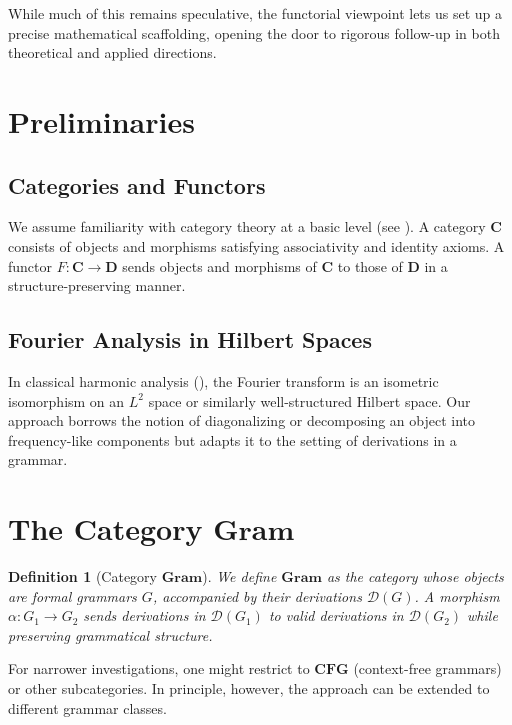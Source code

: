 \documentclass[11pt]{article}
\newtheorem{definition}{Definition}[section]
\begin{document}
While much of this remains speculative, the functorial viewpoint lets us set up a precise mathematical scaffolding, opening the door to rigorous follow-up in both theoretical and applied directions.

\section{Preliminaries}
\subsection{Categories and Functors}
We assume familiarity with category theory at a basic level (see \cite{maclane}). A category \(\mathbf{C}\) consists of objects and morphisms satisfying associativity and identity axioms. A functor \(F: \mathbf{C} \to \mathbf{D}\) sends objects and morphisms of \(\mathbf{C}\) to those of \(\mathbf{D}\) in a structure-preserving manner.

\subsection{Fourier Analysis in Hilbert Spaces}
In classical harmonic analysis (\cite{folland}), the Fourier transform is an isometric isomorphism on an \(L^2\) space or similarly well-structured Hilbert space. Our approach borrows the notion of diagonalizing or decomposing an object into frequency-like components but adapts it to the setting of derivations in a grammar.

\section{The Category \texorpdfstring{\(\mathbf{Gram}\)}{Gram}}
\begin{definition}[Category \(\mathbf{Gram}\)]
We define \(\mathbf{Gram}\) as the category whose objects are formal grammars \(G\), accompanied by their derivations \(\mathcal{D}(G)\). A morphism \(\alpha: G_1 \to G_2\) sends derivations in \(\mathcal{D}(G_1)\) to valid derivations in \(\mathcal{D}(G_2)\) while preserving grammatical structure.
\end{definition}

For narrower investigations, one might restrict to \(\mathbf{CFG}\) (context-free grammars) or other subcategories. In principle, however, the approach can be extended to different grammar classes.
\end{document}

